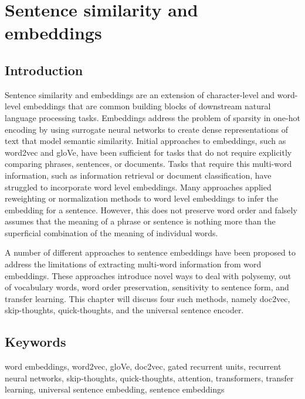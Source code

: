 \chapter{Sentence similarity and embeddings}
\section{\label{sec:level1} Introduction}

Sentence similarity and embeddings are an extension of character-level and word-level embeddings that are common building blocks of downstream natural language processing tasks. Embeddings address the problem of sparsity in one-hot encoding by using surrogate neural networks to create dense representations of text that model semantic similarity. Initial approaches to embeddings, such as word2vec and gloVe, have been sufficient for tasks that do not require explicitly comparing phrases, sentences, or documents. Tasks that require this multi-word information, such as information retrieval or document classification, have struggled to incorporate word level embeddings. Many approaches applied reweighting or normalization methods to word level embeddings to infer the embedding for a sentence. However, this does not preserve word order and falsely assumes that the meaning of a phrase or sentence is nothing more than the superficial combination of the meaning of individual words. 

A number of different approaches to sentence embeddings have been proposed to address the limitations of extracting multi-word information from word embeddings. These approaches introduce novel ways to deal with polysemy, out of vocabulary words, word order preservation, sensitivity to sentence form, and transfer learning. This chapter will discuss four such methods, namely doc2vec, skip-thoughts, quick-thoughts, and the universal sentence encoder. 


\section{\label{keywords} Keywords}
word embeddings, word2vec, gloVe, doc2vec, gated recurrent units, recurrent neural networks, skip-thoughts, quick-thoughts, attention, transformers, transfer learning, universal sentence embedding, sentence embeddings

